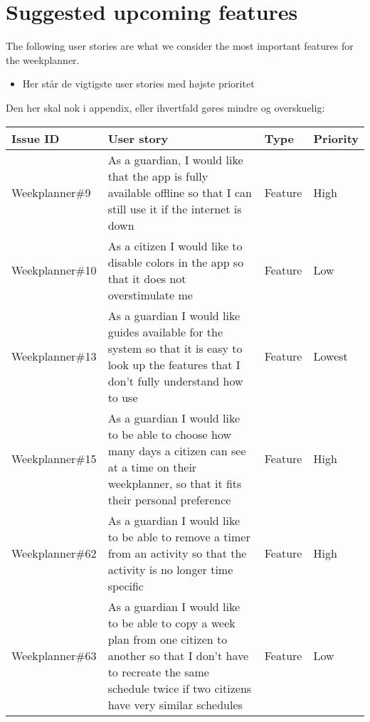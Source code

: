 \section{Suggested upcoming features}
The following user stories are what we consider the most important features for the weekplanner.



\begin{itemize}
    \item Her står de vigtigste user stories med højste prioritet
\end{itemize}

Den her skal nok i appendix, eller ihvertfald gøres mindre og overskuelig:

\begin{longtable}{|p{2.9cm}|p{7cm}|p{1.4cm}|p{1.5cm}|}
    \hline
    Issue ID         & User story                                                                                                                                                                & Type & Priority     \\ \hline
    Weekplanner\#9   & As a guardian, I would like that the app is fully available offline so that I can still use it if the internet is down                                                    & Feature & High      \\ \hline
    Weekplanner\#10  & As a citizen I would like to disable colors in the app so that it does not overstimulate me                                                                               & Feature & Low      \\ \hline
    Weekplanner\#13  & As a guardian I would like guides available for the system so that it is easy to look up the features that I don't fully understand how to use                            & Feature & Lowest      \\ \hline
    Weekplanner\#15  & As a guardian I would like to be able to choose how many days a citizen can see at a time on their weekplanner, so that it fits their personal preference                 & Feature & High    \\ \hline
    Weekplanner\#62  & As a guardian I would like to be able to remove a timer from an activity so that the activity is no longer time specific                                                  & Feature & High  \\ \hline
    Weekplanner\#63  & As a guardian I would like to be able to copy a week plan from one citizen to another so that I don’t have to recreate the same schedule twice if two citizens have very similar schedules  & Feature & Low  \\ \hline

\end{longtable}

